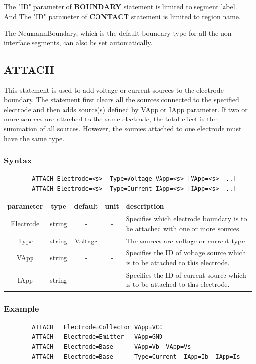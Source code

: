 \documentclass[11pt,pdftex]{article}
\begin{document}
The "ID" parameter of \textbf{BOUNDARY} statement is limited to
segment label. And The "ID" parameter of \textbf{CONTACT} statement
is limited to region name.

The NeumannBoundary, which is the default boundary type for all the
non-interface segments, can also be set automatically.

\newpage
\subsection{ATTACH}
This statement is used to add voltage or current sources to the
electrode boundary. The statement first clears all the sources
connected to the specified electrode and then adds source(s) defined
by VApp or IApp parameter. If two or more sources are attached to
the same electrode, the total effect is the summation of all
sources. However, the sources attached to one electrode must have
the same type.

\subsubsection*{Syntax}
\begin{verbatim}
        ATTACH Electrode=<s>  Type=Voltage VApp=<s> [VApp=<s> ...]
        ATTACH Electrode=<s>  Type=Current IApp=<s> [IApp=<s> ...]
\end{verbatim}

\small \noindent\begin{longtable}{ccccp{7cm}}
\textbf{parameter}   & \textbf{type}    & \textbf{default} & \textbf{unit} & \textbf{description} \\
Electrode     & string  & -  & -    & Specifies which electrode boundary is to be attached with one or more sources.\\
Type          & string  & Voltage  & -    & The sources are voltage or current type.\\
VApp          & string  & -  & -    & Specifies the ID of voltage source which is to be attached to this electrode.\\
IApp          & string  & -  & -    & Specifies the ID of current source which is to be attached to this electrode.\\
\end{longtable}
\normalsize

\subsubsection*{Example}
\begin{verbatim}
        ATTACH   Electrode=Collector VApp=VCC
        ATTACH   Electrode=Emitter   VApp=GND
        ATTACH   Electrode=Base      VApp=Vb  VApp=Vs
        ATTACH   Electrode=Base      Type=Current  IApp=Ib  IApp=Is
\end{verbatim}
\end{document}
